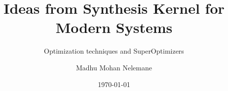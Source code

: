 \author[Madhu Mohan Nelemane]{Madhu Mohan Nelemane}
\title{Ideas from Synthesis Kernel for Modern Systems}
\subtitle{Optimization techniques and SuperOptimizers}
\date{\today}

\subject{subject}

\institute[OSE]{\chair\\ \chairsub}


\gittrue
\presentationtrue
